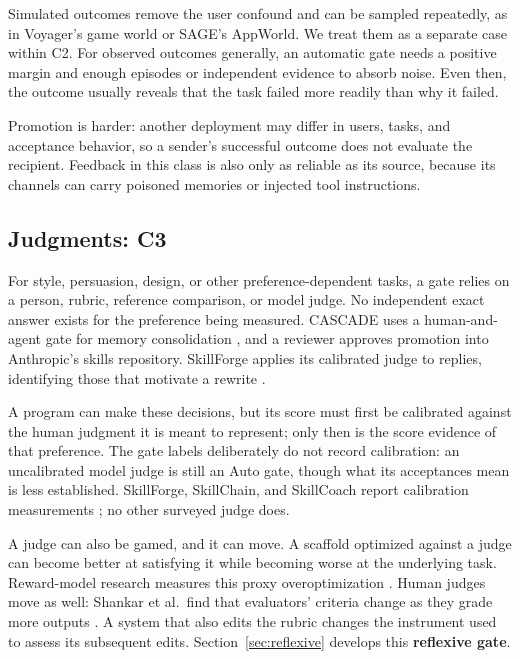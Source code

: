 Simulated outcomes remove the user confound and can be sampled repeatedly, as in Voyager's game world or SAGE's AppWorld. We treat them as a separate case within C2. For observed outcomes generally, an automatic gate needs a positive margin and enough episodes or independent evidence to absorb noise. Even then, the outcome usually reveals that the task failed more readily than why it failed.

Promotion is harder: another deployment may differ in users, tasks, and acceptance behavior, so a sender's successful outcome does not evaluate the recipient. Feedback in this class is also only as reliable as its source, because its channels can carry poisoned memories or injected tool instructions.

\subsection{Judgments: C3}\label{judgments-c3}

For style, persuasion, design, or other preference-dependent tasks, a gate relies on a person, rubric, reference comparison, or model judge. No independent exact answer exists for the preference being measured. CASCADE uses a human-and-agent gate for memory consolidation \cite{huang2025cascade}, and a reviewer approves promotion into Anthropic's skills repository. SkillForge applies its calibrated judge to replies, identifying those that motivate a rewrite \cite{skillforge2026}.

A program can make these decisions, but its score must first be calibrated against the human judgment it is meant to represent; only then is the score evidence of that preference. The gate labels deliberately do not record calibration: an uncalibrated model judge is still an Auto gate, though what its acceptances mean is less established. SkillForge, SkillChain, and SkillCoach report calibration measurements \cite{skillforge2026, hu2026skillchain, zhu2026skillcoach}; no other surveyed judge does.

A judge can also be gamed, and it can move. A scaffold optimized against a judge can become better at satisfying it while becoming worse at the underlying task. Reward-model research measures this proxy overoptimization \cite{gao2023overoptimization}. Human judges move as well: Shankar et al.~find that evaluators' criteria change as they grade more outputs \cite{shankar2024validators}. A system that also edits the rubric changes the instrument used to assess its subsequent edits. Section~\ref{sec:reflexive} develops this \textbf{reflexive gate}.

